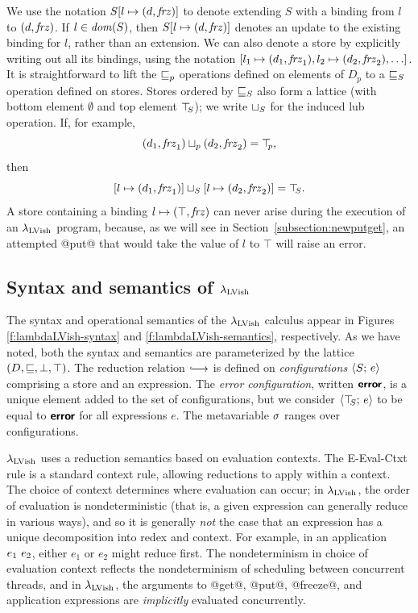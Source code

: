 \documentclass{article}
\begin{document}
We use the notation $S[l \mapsto (d, \mathit{frz})]$ to denote extending $S$
with a binding from $l$ to $(d, \mathit{frz})$.  If $l \in \mathit{dom}(S)$,
then $S[l \mapsto (d, \mathit{frz})]$ denotes an update to the existing
binding for $l$, rather than an extension.  We can also denote a store
by explicitly writing out all its bindings, using the notation
$\store{\storebinding{l_1}{d_1}{\status_1},
  \storebinding{l_2}{d_2}{\status_2}, \dots}$.  It is straightforward
to lift the $\sqsubseteq_p$ operations defined on elements of $D_p$ to a
$ \sqsubseteq_S $ operation defined on stores.  Stores ordered by
$ \sqsubseteq_S $ also form a lattice (with bottom element $\emptyset$
and top element $\top\hspace{-0.85mm}_{S}$); we write $ \sqcup_{S} $ for the induced lub
operation. If, for example,
\[ (d_1, \mathit{frz}_1) \sqcup_p (d_2, \mathit{frz}_2) = \top\hspace{-0.85mm}_{p}, \]
then
\[ \left[ l \mapsto (d_1, \mathit{frz}_1) \right] \sqcup_{S} \left[ l \mapsto (d_2, \mathit{frz}_2) \right] =
\top\hspace{-0.85mm}_{S}. \] A store containing a binding
$l \mapsto (\top, \mathit{frz})$ can never arise during the execution
of an $\lambda_{\textrm{LVish}}$ program, because, as we will see in
Section~\ref{subsection:newputget}, an attempted @put@ that would
take the value of $l$ to $\top$ will raise an error.

\subsection{Syntax and semantics of $\lambda_{\textrm{LVish}}$}

\FigLambdaLVishGrammar

\FigLambdaLVishSemantics

The syntax and operational semantics of the $\lambda_{\textrm{LVish}}$ calculus
appear in Figures \ref{f:lambdaLVish-syntax} and
\ref{f:lambdaLVish-semantics}, respectively.  As we have noted, both
the syntax and semantics are parameterized by the lattice $(D,
\sqsubseteq, \bot, \top)$.  The reduction relation $\parstepsto$ is
defined on \emph{configurations} $\langle S;\, e \rangle$ comprising a store
and an expression.  The \emph{error configuration}, written $\textbf{\textsf{error}}$,
is a unique element added to the set of configurations, but we
consider $\langle \top\hspace{-0.85mm}_{S};\, e \rangle$ to be equal to $\textbf{\textsf{error}}$ for all
expressions $e$.  The metavariable $\sigma$ ranges over configurations.

$\lambda_{\textrm{LVish}}$ uses a reduction semantics based on evaluation
contexts.  The {\sc E-Eval-Ctxt} rule is a standard context rule,
allowing reductions to apply within a context.  The choice of context
determines where evaluation can occur; in $\lambda_{\textrm{LVish}}$, the order of
evaluation is nondeterministic (that is, a given expression can
generally reduce in various ways), and so it is generally \emph{not}
the case that an expression has a unique decomposition into redex and
context.  For example, in an application $e_1~e_2$, either
$e_1$ or $e_2$ might reduce first.  The nondeterminism in choice of
evaluation context reflects the nondeterminism of scheduling between
concurrent threads, and in $\lambda_{\textrm{LVish}}$, the arguments to @get@,
@put@, @freeze@, and application expressions are \emph{implicitly}
evaluated concurrently.
\end{document}
